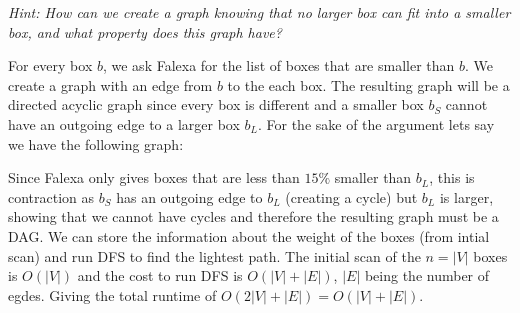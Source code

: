 \documentclass[11pt]{article}
\begin{document}
\begin{subparts}
\noindent \textit{Hint: How can we create a graph knowing that no larger box can fit into a smaller box, and what property does this graph have?}\\
\begin{solution}
    For every box $b$, we ask Falexa for the list of boxes that are smaller than $b$. We create a graph with an edge from $b$ to the each box. The resulting
    graph will be a directed acyclic graph since every box is different and a smaller box $b_S$ cannot have an outgoing edge to a larger box $b_L$. For the sake of the argument
    lets say we have the following graph:\\
    \begin{center}
    \end{center}
    Since Falexa only gives boxes that are less than $15\%$ smaller than $b_L$, this is contraction as $b_S$ has an outgoing edge to $b_L$ (creating a cycle) but $b_L$ is larger, 
    showing that we cannot have cycles and therefore the resulting graph must be a DAG. We can store the information about the weight of the boxes (from intial scan) and run DFS to find the lightest path. The initial scan of the $n = |V|$ boxes is $O(|V|)$
    and the cost to run DFS is $O(|V| + |E|)$, $|E|$ being the number of egdes. Giving the total runtime of $O(2|V| + |E|) = O(|V| + |E|)$.
\end{solution}
\end{subparts}
\end{document}
